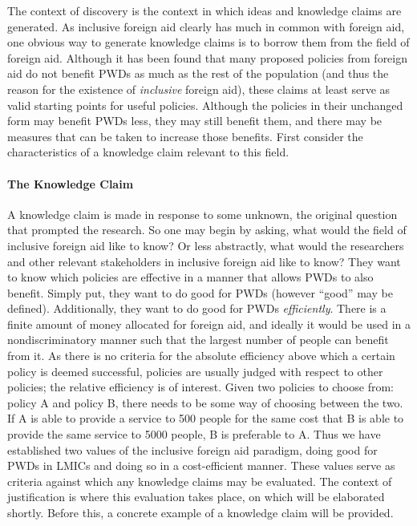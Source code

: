 \documentclass[a4paper]{article}
\begin{document}
The context of discovery is the context in which ideas and knowledge claims
are generated. As inclusive foreign aid clearly has much in common with
foreign aid, one obvious way to generate knowledge claims is to borrow them
from the field of foreign aid. Although it has been found that many proposed
policies from foreign aid do not benefit PWDs as much as the rest of the
population (and thus the reason for the existence of \emph{inclusive} foreign
aid), these claims at least serve as valid starting points for useful
policies. Although the policies in their unchanged form may benefit PWDs less,
they may still benefit them, and there may be measures that can be taken to
increase those benefits. First consider the characteristics of a knowledge
claim relevant to this field.


\paragraph{The Knowledge Claim}

A knowledge claim is made in response to some unknown, the original question
that prompted the research. So one may begin by asking, what would the field
of inclusive foreign aid like to know? Or less abstractly, what would the
researchers and other relevant stakeholders in inclusive foreign aid like to
know? They want to know which policies are effective in a manner that allows
PWDs to also benefit. Simply put, they want to do good for PWDs (however
``good'' may be defined). Additionally, they want to do good for PWDs
\emph{efficiently}. There is a finite amount of money allocated for foreign
aid, and ideally it would be used in a nondiscriminatory manner such that the
largest number of people can benefit from it. As there is no criteria for the
absolute efficiency above which a certain policy is deemed successful,
policies are usually judged with respect to other policies; the relative
efficiency is of interest. Given two policies to choose from: policy A and
policy B, there needs to be some way of choosing between the two. If A is able
to provide a service to 500 people for the same cost that B is able to provide
the same service to 5000 people, B is preferable to A. Thus we have
established two values of the inclusive foreign aid paradigm, doing good for
PWDs in LMICs and doing so in a cost-efficient manner. These values serve as
criteria against which any knowledge claims may be evaluated. The context of
justification is where this evaluation takes place, on which will be
elaborated shortly. Before this, a concrete example of a knowledge claim will
be provided.
\end{document}
